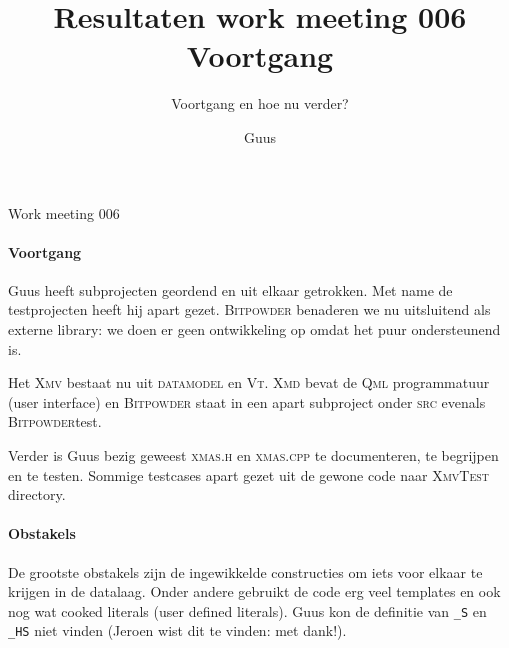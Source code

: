 \documentclass[a4paper,final]{article}
\title{Resultaten work meeting 006 Voortgang }
\author{Guus}
\begin{document}

\newcommand{\Noc}{\textsc{NoC}\xspace}
\newcommand{\w}[1]{\textsc{#1}\xspace}
\newcommand{\qml}{\textsc{Qml}\xspace}
\newcommand{\qt}{\textsc{Qt}\xspace}
\newcommand{\qtquick}{\textsc{QtQuick}\xspace}
\newcommand{\cpp}{\textsc{C++}\xspace}
\newcommand{\xmv}{\textsc{Xmv}\xspace}
\newcommand{\xmd}{\textsc{Xmd}\xspace}
\newcommand{\xmvtest}{\textsc{XmvTest}\xspace}
\newcommand{\xmdtest}{\textsc{XmdTest}\xspace}
\newcommand{\bitpowder}{\textsc{Bitpowder}\xspace}
\newcommand{\datamodel}{\textsc{datamodel}\xspace}
\newcommand{\vt}{\textsc{Vt}\xspace}
\newcommand{\src}{\textsc{src}\xspace}
\newcommand{\agilefant}{\textsc{AgileFant}\xspace}


\begin{Minutes}{Work meeting 006}
\subtitle{Voortgang en hoe nu verder?}

\maketitle%


\paragraph{Voortgang} Guus heeft subprojecten geordend en uit elkaar getrokken. Met name de 
testprojecten heeft hij apart gezet. \bitpowder benaderen we nu uitsluitend als externe
library: we doen er geen ontwikkeling op omdat het puur ondersteunend is.

Het \xmv bestaat nu uit \datamodel en \vt. \xmd bevat de \qml programmatuur (user interface)
en \bitpowder staat in een apart subproject onder \src evenals \bitpowder{}test.

Verder is Guus bezig geweest \w{xmas.h} en \w{xmas.cpp} te documenteren, te begrijpen
en te testen. Sommige testcases apart gezet uit de gewone code naar \xmvtest directory.

\paragraph{Obstakels} De grootste obstakels zijn de ingewikkelde constructies 
om iets voor elkaar te krijgen in de datalaag. Onder andere gebruikt de code erg veel 
templates en ook nog wat cooked literals (user defined literals). Guus kon de definitie 
van \texttt{\_S} en \texttt{\_HS} niet vinden (Jeroen wist dit te vinden: met dank!).


\end{Minutes}
\end{document}
